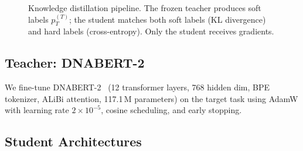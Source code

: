 \documentclass{article}
\begin{document}
\begin{figure}[t]
\caption{Knowledge distillation pipeline. The frozen teacher produces soft labels $p_T^{(T)}$; the student matches both soft labels (KL divergence) and hard labels (cross-entropy). Only the student receives gradients.}
\label{fig:kd_flow}
\end{figure}

\subsection{Teacher: DNABERT-2}

We fine-tune DNABERT-2~\cite{zhou2023dnabert2} (12 transformer layers, 768 hidden dim, BPE tokenizer, ALiBi attention, 117.1\,M parameters) on the target task using AdamW with learning rate $2\!\times\!10^{-5}$, cosine scheduling, and early stopping.

\subsection{Student Architectures}
\end{document}
